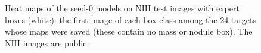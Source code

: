 \begin{table}[!t]
\centering
\caption{Pointing game on the 984 NIH expert boxes (164 focal: Mass, Nodule): hit rate averaged over the five seeds, with a 95\,\%
image-cluster bootstrap interval (descriptive).}
\label{tab:xm_pointing}
\end{table}

\begin{figure}[!t]
\centering
{}
\caption{Heat maps of the seed-0 models on NIH test images with expert boxes (white): the first image of each box class among the 24
targets whose maps were saved (these contain no mass or nodule box). The NIH images are public.}
\label{fig:xm_xai}
\end{figure}

